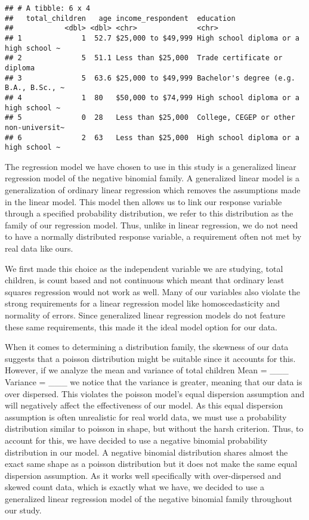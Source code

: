 \documentclass[
]{article}
\begin{document}
\begin{verbatim}
## # A tibble: 6 x 4
##   total_children   age income_respondent  education                             
##            <dbl> <dbl> <chr>              <chr>                                 
## 1              1  52.7 $25,000 to $49,999 High school diploma or a high school ~
## 2              5  51.1 Less than $25,000  Trade certificate or diploma          
## 3              5  63.6 $25,000 to $49,999 Bachelor's degree (e.g. B.A., B.Sc., ~
## 4              1  80   $50,000 to $74,999 High school diploma or a high school ~
## 5              0  28   Less than $25,000  College, CEGEP or other non-universit~
## 6              2  63   Less than $25,000  High school diploma or a high school ~
\end{verbatim}

The regression model we have chosen to use in this study is a
generalized linear regression model of the negative binomial family. A
generalized linear model is a generalization of ordinary linear
regression which removes the assumptions made in the linear model. This
model then allows us to link our response variable through a specified
probability distribution, we refer to this distribution as the family of
our regression model. Thus, unlike in linear regression, we do not need
to have a normally distributed response variable, a requirement often
not met by real data like ours.

We first made this choice as the independent variable we are studying,
total children, is count based and not continuous which meant that
ordinary least squares regression would not work as well. Many of our
variables also violate the strong requirements for a linear regression
model like homoscedasticity and normality of errors. Since generalized
linear regression models do not feature these same requirements, this
made it the ideal model option for our data.

When it comes to determining a distribution family, the skewness of our
data suggests that a poisson distribution might be suitable since it
accounts for this. However, if we analyze the mean and variance of total
children Mean = \_\_\_ Variance = \_\_\_ we notice that the variance is
greater, meaning that our data is over dispersed. This violates the
poisson model's equal dispersion assumption and will negatively affect
the effectiveness of our model. As this equal dispersion assumption is
often unrealistic for real world data, we must use a probability
distribution similar to poisson in shape, but without the harsh
criterion. Thus, to account for this, we have decided to use a negative
binomial probability distribution in our model. A negative binomial
distribution shares almost the exact same shape as a poisson
distribution but it does not make the same equal dispersion assumption.
As it works well specifically with over-dispersed and skewed count data,
which is exactly what we have, we decided to use a generalized linear
regression model of the negative binomial family throughout our study.
\end{document}
